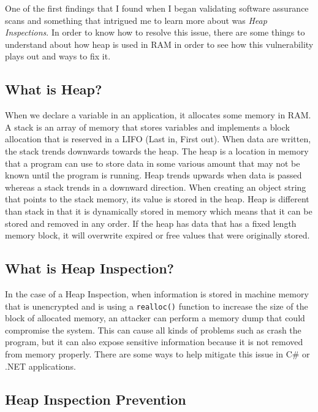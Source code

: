 One of the first findings that I found when I began validating software assurance scans and something that intrigued me to learn more about was \textit{Heap Inspections}.\autocite{20210419-cwe-244} In order to know how to resolve this issue, there are some things to understand about how heap is used in RAM in order to see how this vulnerability plays out and ways to fix it.

\subsection{What is Heap?}

When we declare a variable in an application, it allocates some memory in RAM. A stack is an array of memory that stores variables and implements a block allocation that is reserved in a LIFO (Last in, First out). When data are written, the stack trends downwards towards the heap. The heap is a location in memory that a program can use to store data in some various amount that may not be known until the program is running. Heap trends upwards when data is passed whereas a stack trends in a downward direction. When creating an object string that points to the stack memory, its value is stored in the heap. Heap is different than stack in that it is dynamically stored in memory which means that it can be stored and removed in any order. If the heap has data that has a fixed length memory block, it will overwrite expired or free values that were originally stored.\autocites{20210419-guru99}{20210419-indika}

\subsection{What is Heap Inspection?}

In the case of a Heap Inspection, when information is stored in machine memory that is unencrypted and is using a \texttt{realloc()} function to increase the size of the block of allocated memory, an attacker can perform a memory dump that could compromise the system. This can cause all kinds of problems such as crash the program, but it can also expose sensitive information because it is not removed from memory properly. There are some ways to help mitigate this issue in C\# or .NET applications.

\subsection{Heap Inspection Prevention}

